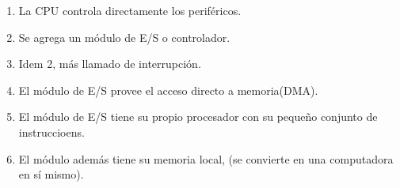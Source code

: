 \begin{enumerate}
  \item La CPU controla directamente los periféricos.
  \item Se agrega un módulo de E/S o controlador.
  \item Idem 2, más llamado de interrupción.
  \item El módulo de E/S provee el acceso directo a memoria(DMA).
  \item El módulo de E/S tiene su propio procesador con su pequeño conjunto de instruccioens.
  \item El módulo además tiene su memoria local, (se convierte en una computadora en sí mismo).
\end{enumerate}


